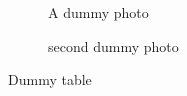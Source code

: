 \documentclass{article}
\begin{document}
  \begin{figure}
    \caption{A dummy photo}
  \end{figure}
  \begin{figure}
    \caption{second dummy photo}
  \end{figure}
  \begin{table}
    \caption{Dummy table}
  \end{table}
  
  \begin{appendix}
   \listoffigures
   \listoftables
  \end{appendix}
\end{document}
